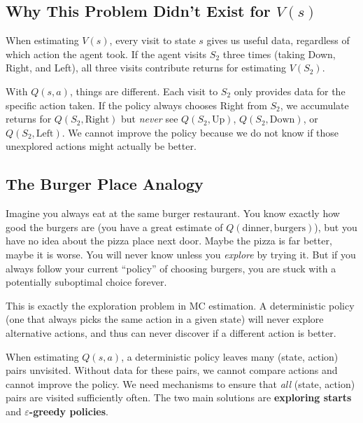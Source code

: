 \documentclass[journal, onecolumn]{IEEEtran}
\newcommand{\vocab}[1]{\textbf{\textcolor{Garnet}{#1}}}
\begin{document}
\subsection{Why This Problem Didn't Exist for $V(s)$}

When estimating $V(s)$, every visit to state $s$ gives us useful data, regardless of which action the agent took. If the agent visits $S_2$ three times (taking Down, Right, and Left), all three visits contribute returns for estimating $V(S_2)$.

With $Q(s,a)$, things are different. Each visit to $S_2$ only provides data for the specific action taken. If the policy always chooses Right from $S_2$, we accumulate returns for $Q(S_2, \text{Right})$ but \textit{never} see $Q(S_2, \text{Up})$, $Q(S_2, \text{Down})$, or $Q(S_2, \text{Left})$. We cannot improve the policy because we do not know if those unexplored actions might actually be better.

\subsection{The Burger Place Analogy}

Imagine you always eat at the same burger restaurant. You know exactly how good the burgers are (you have a great estimate of $Q(\text{dinner}, \text{burgers})$), but you have no idea about the pizza place next door. Maybe the pizza is far better, maybe it is worse. You will never know unless you \textit{explore} by trying it. But if you always follow your current ``policy'' of choosing burgers, you are stuck with a potentially suboptimal choice forever.

This is exactly the exploration problem in MC estimation. A deterministic policy (one that always picks the same action in a given state) will never explore alternative actions, and thus can never discover if a different action is better.

\begin{tcolorbox}[memorybox={The Exploration Problem}]
When estimating $Q(s,a)$, a deterministic policy leaves many (state, action) pairs unvisited. Without data for these pairs, we cannot compare actions and cannot improve the policy. We need mechanisms to ensure that \textit{all} (state, action) pairs are visited sufficiently often. The two main solutions are \vocab{exploring starts} and \vocab{$\varepsilon$-greedy policies}.
\end{tcolorbox}

\end{document}
